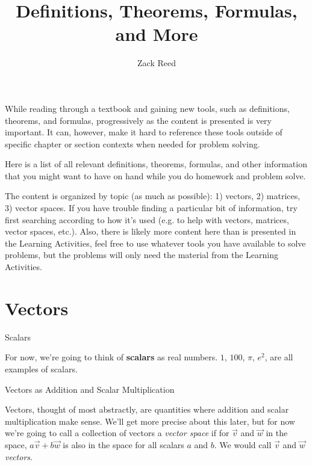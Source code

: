 \documentclass{ximera}
\author{Zack Reed}
\title{Definitions, Theorems, Formulas, and More}
\begin{document}
\begin{abstract}

\end{abstract}
\maketitle

While reading through a textbook and gaining new tools, such as definitions, theorems, and formulas, progressively as the content is presented is very important. It can, however, make it hard to reference these tools outside of specific chapter or section contexts when needed for problem solving.

Here is a list of all relevant definitions, theorems, formulas, and other information that you might want to have on hand while you do homework and problem solve.

The content is organized by topic (as much as possible): 1) vectors, 2) matrices, 3) vector spaces. If you have trouble finding a particular bit of information, try first searching according to how it's used (e.g. to help with vectors, matrices, vector spaces, etc.). Also, there is likely more content here than is presented in the Learning Activities, feel free to use whatever tools you have available to solve problems, but the problems will only need the material from the Learning Activities.

\section{Vectors}

\begin{definition}{Scalars}

    For now, we're going to think of \textbf{scalars} as real numbers. $1$, $100$, $\pi$, $e^2$, are all examples of scalars.

  \end{definition}

  \begin{definition}{Vectors as Addition and Scalar Multiplication}

    Vectors, thought of most abstractly, are quantities where addition and scalar multiplication make sense. We'll get more precise about this later, but for now we're going to call a collection of vectors a \textit{vector space} if for $\vec{v}$ and $\vec{w}$ in the space, $a\vec{v}+b\vec{w}$ is also in the space for all scalars $a$ and $b$. We would call $\vec{v}$ and $\vec{w}$ \textit{vectors}.

  \end{definition}
\end{document}

